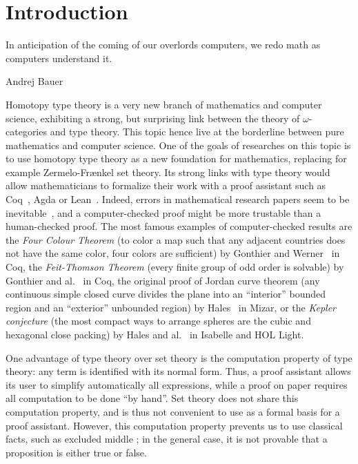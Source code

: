 \chapter{Introduction}
\label{chap:intro} \epigraph{In anticipation of the coming of our
overlords computers, we redo math as computers understand it.}{Andrej
Bauer}

Homotopy type theory is a very new branch of mathematics and computer
science, exhibiting a strong, but surprising link between the theory
of $\omega$-categories and type theory. This topic hence live at the
borderline between pure mathematics and computer science. One of the
goals of researches on this topic is to use homotopy type theory as a
new foundation for mathematics, replacing for example Zermelo-Frænkel
set theory. Its strong links with type theory would allow
mathematicians to formalize their work with a proof assistant such as
Coq~\cite{coq:refman:8.4}, Agda\cite{norell2007towards} or
Lean~\cite{lean}. Indeed, errors in mathematical research papers seem
to be inevitable~\cite{vv-univ-f}, and a computer-checked proof might
be more trustable than a human-checked proof.  The most famous
examples of computer-checked results are the {\em Four Colour Theorem}
(to color a map such that any adjacent countries does not have the
same color, four colors are sufficient) by Gonthier and
Werner~\cite{gonthier-four-color} in Coq, the {\em Feit-Thomson
Theorem} (every finite group of odd order is solvable) by Gonthier and
al.~\cite{gonthier-feit} in Coq, the original proof of Jordan curve
theorem (any continuous simple closed curve divides the plane into an
``interior'' bounded region and an ``exterior'' unbounded region) by
Hales~\cite{hales-jordan} in Mizar, or the {\em Kepler conjecture}
(the most compact ways to arrange spheres are the cubic and hexagonal
close packing) by Hales and al.~\cite{hales-kepler} in Isabelle and
HOL Light.

One advantage of type theory over set theory is the computation
property of type theory: any term is identified with its normal
form. Thus, a proof assistant allows its user to simplify
automatically all expressions, while a proof on paper requires all
computation to be done ``by hand''. Set theory does not share this
computation property, and is thus not convenient to use as a formal
basis for a proof assistant. However, this computation property
prevents us to use classical facts, such as excluded middle ; in the
general case, it is not provable that a proposition is either true or
false.

